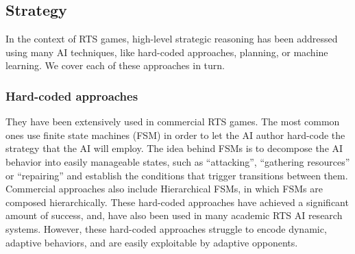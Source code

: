\documentclass{llncs}
\begin{document}



\subsection*{Strategy}

In the context of RTS  games, high-level strategic reasoning has been addressed using many
AI techniques, like  hard-coded approaches, planning,
or  machine   learning.  We  cover   each  of  these
approaches in turn.

\subsubsection*{Hard-coded  approaches}
They have  been extensively  used in commercial  RTS games.   The most
common      ones     use      finite     state      machines     (FSM)
\cite{FSM_AIGameProgWisdom2003}  in   order  to  let  the   AI  author
hard-code the strategy  that the AI will employ. The  idea behind FSMs
is to decompose the AI behavior into easily manageable states, such as
``attacking'', ``gathering resources''  or ``repairing'' and establish
the  conditions that  trigger  transitions  between them.   Commercial
approaches also include Hierarchical FSMs,  in which FSMs are composed
hierarchically.    These  hard-coded   approaches   have  achieved   a
significant  amount of  success,  and, have  also been  used in  many academic  RTS AI
research systems.   However, these  hard-coded approaches  struggle to
encode  dynamic, adaptive  behaviors,  and are  easily exploitable  by
adaptive opponents.
\end{document}
